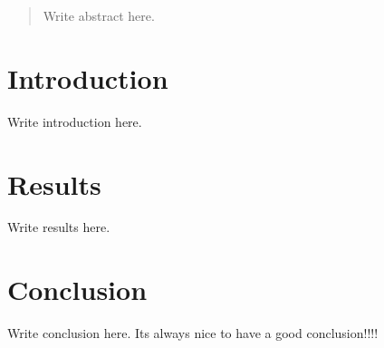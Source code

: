 \documentclass{article}
\begin{document}
\begin{abstract}
Write abstract here.
\end{abstract}

\section{Introduction}

Write introduction here.

\section{Results}

Write results here.

\section{Conclusion}

Write conclusion here.
Its always nice to have a good conclusion!!!!
\end{document}
